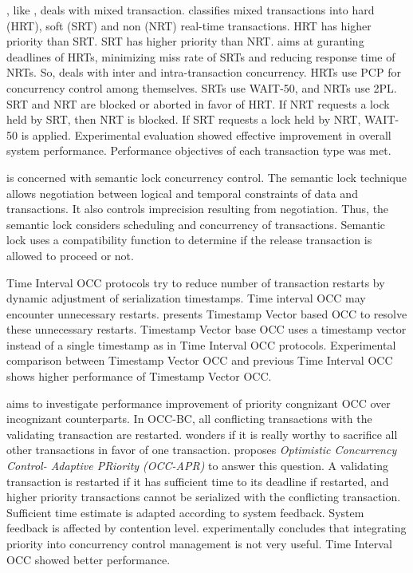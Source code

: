 \documentclass[12pt,english]{report}
\begin{document}
\cite{853991}, like \cite{lam1997concurrency}, deals with mixed
transaction. \cite{853991} classifies mixed transactions into hard
(HRT), soft (SRT) and non (NRT) real-time transactions. HRT has higher
priority than SRT. SRT has higher priority than NRT. \cite{853991}
aims at guranting deadlines of HRTs, minimizing miss rate of SRTs
and reducing response time of NRTs. So, \cite{853991} deals with
inter and intra-transaction concurrency. HRTs use PCP for concurrency
control among themselves. SRTs use WAIT-50, and NRTs use 2PL. SRT
and NRT are blocked or aborted in favor of HRT. If NRT requests a
lock held by SRT, then NRT is blocked. If SRT requests a lock held
by NRT, WAIT-50 is applied. Experimental evaluation showed effective
improvement in overall system performance. Performance objectives
of each transaction type was met.

\cite{1401009} is concerned with semantic lock concurrency control.
The semantic lock technique allows negotiation between logical and
temporal constraints of data and transactions. It also controls imprecision
resulting from negotiation. Thus, the semantic lock considers scheduling
and concurrency of transactions. Semantic lock uses a compatibility
function to determine if the release transaction is allowed to proceed
or not.

Time Interval OCC protocols try to reduce number of transaction restarts
by dynamic adjustment of serialization timestamps. Time interval OCC
may encounter unnecessary restarts. \cite{4680843} presents Timestamp
Vector based OCC to resolve these unnecessary restarts. Timestamp
Vector base OCC uses a timestamp vector instead of a single timestamp
as in Time Interval OCC protocols. Experimental comparison between
Timestamp Vector OCC and previous Time Interval OCC shows higher performance
of Timestamp Vector OCC.

\cite{859541} aims to investigate performance improvement of priority
congnizant OCC over incognizant counterparts. In OCC-BC, all conflicting
transactions with the validating transaction are restarted. \cite{859541}
wonders if it is really worthy to sacrifice all other transactions
in favor of one transaction. \cite{859541} proposes \textit{Optimistic
Concurrency Control- Adaptive PRiority (OCC-APR)} to answer this question.
A validating transaction is restarted if it has sufficient time to
its deadline if restarted, and higher priority transactions cannot
be serialized with the conflicting transaction. Sufficient time estimate
is adapted according to system feedback. System feedback is affected
by contention level. \cite{859541} experimentally concludes that
integrating priority into concurrency control management is not very
useful. Time Interval OCC showed better performance.
\end{document}
